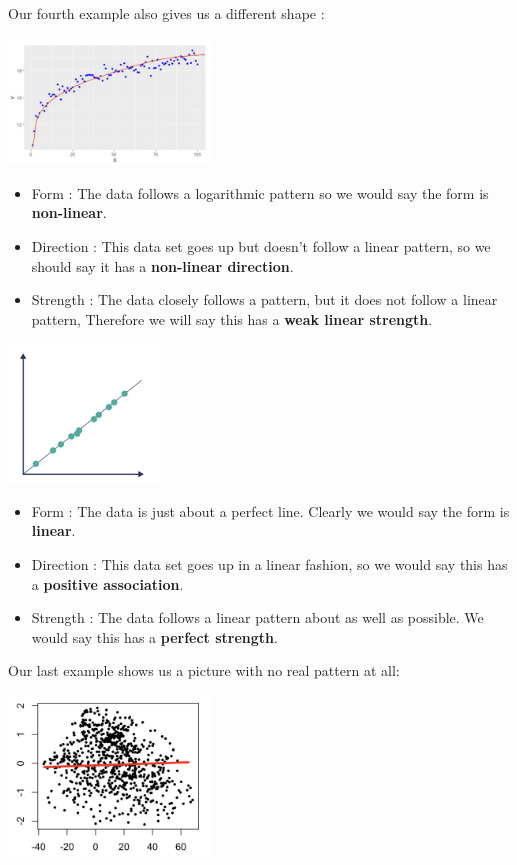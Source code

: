 \documentclass[
  letterpaper,
  DIV=11,
  numbers=noendperiod]{scrreprt}
\providecommand{\tightlist}{%
  \setlength{\itemsep}{0pt}\setlength{\parskip}{0pt}}\usepackage{longtable,booktabs,array}
\begin{document}
Our fourth example also gives us a different shape :

\includegraphics[width=0.4\textwidth,height=\textheight]{./images/SC_4.jpg}

\begin{itemize}
\tightlist
\item
  Form : The data follows a logarithmic pattern so we would say the form
  is \textbf{non-linear}.
\item
  Direction : This data set goes up but doesn't follow a linear pattern,
  so we should say it has a \textbf{non-linear direction}.
\item
  Strength : The data closely follows a pattern, but it does not follow
  a linear pattern, Therefore we will say this has a \textbf{weak linear
  strength}.
\end{itemize}

\includegraphics[width=0.3\textwidth,height=\textheight]{./images/SC_5.jpg}

\begin{itemize}
\tightlist
\item
  Form : The data is just about a perfect line. Clearly we would say the
  form is \textbf{linear}.
\item
  Direction : This data set goes up in a linear fashion, so we would say
  this has a \textbf{positive association}.
\item
  Strength : The data follows a linear pattern about as well as
  possible. We would say this has a \textbf{perfect strength}.
\end{itemize}

Our last example shows us a picture with no real pattern at all:

\includegraphics[width=0.4\textwidth,height=\textheight]{./images/SC_6.jpg}
\end{document}
